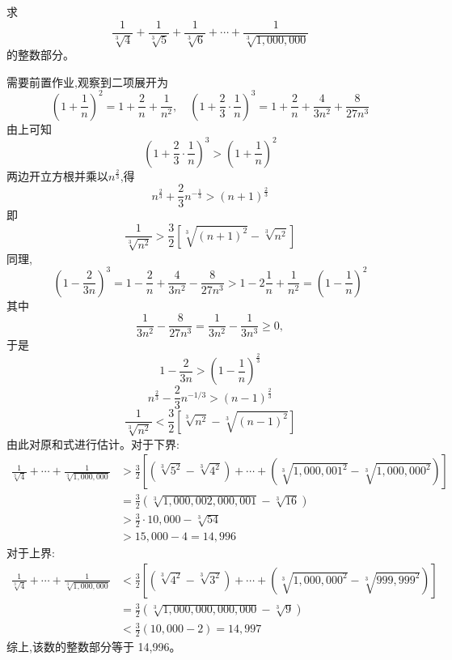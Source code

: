 \begin{questions}
    \question 求
    \[
    \frac{1}{\sqrt[3]{4}} + \frac{1}{\sqrt[3]{5}} + \frac{1}{\sqrt[3]{6}} + \cdots + \frac{1}{\sqrt[3]{1,000,000}}
    \]
    的整数部分。
    \begin{solution}
        需要前置作业,观察到二项展开为
        \[
        \left(1 + \frac{1}{n}\right)^2 = 1 + \frac{2}{n} + \frac{1}{n^2},\quad \left(1 + \frac{2}{3} \cdot \frac{1}{n}\right)^3 = 1 + \frac{2}{n} + \frac{4}{3n^2} + \frac{8}{27n^3}
        \]
        由上可知
        \[ 
        \left(1 + \frac{2}{3} \cdot \frac{1}{n}\right)^3 > \left(1 + \frac{1}{n}\right)^2 
        \]
        两边开立方根并乘以$n^{\frac{2}{3}}$,得
        \[
        n^{\frac{2}{3}} + \frac{2}{3} n^{-\frac{1}{3}} > (n+1)^{\frac{2}{3}}
        \]
        即
        \[ 
        \frac{1}{\sqrt[3]{n^2}} > \frac{3}{2} \left[ \sqrt[3]{(n+1)^2} - \sqrt[3]{n^2} \right] 
        \]
        同理,
        \[
        \left( 1 - \frac{2}{3n} \right)^3 
        = 1 - \frac{2}{n} + \frac{4}{3n^2} - \frac{8}{27n^3} > 1 - 2\frac{1}{n} + \frac{1}{n^2} 
        = \left( 1 - \frac{1}{n} \right)^2
        \]
        其中 
        \[
        \frac{1}{3n^2} - \frac{8}{27n^3} = \frac{1}{3n^2} - \frac{1}{3n^3} \ge 0,
        \]
        于是
        \[
        1 - \frac{2}{3n} > \left( 1 - \frac{1}{n} \right)^{\frac{2}{3}}
        \]
        \[
        n^{\frac{2}{3}} - \frac{2}{3}n^{-1/3} > (n - 1)^{\frac{2}{3}}
        \]
        \[ 
        \frac{1}{\sqrt[3]{n^2}} < \frac
        {3}{2} \left[ \sqrt[3]{n^2} - \sqrt[3]{(n-1)^2} \right] 
        \]
        由此对原和式进行估计。对于下界:
        \begin{align*}
        \frac{1}{\sqrt[3]{4}} + \cdots + \frac{1}{\sqrt[3]{1,000,000}} 
        &> \frac{3}{2} \left[(\sqrt[3]{5^2} - \sqrt[3]{4^2}) + \cdots + (\sqrt[3]{1,000,001^2} - \sqrt[3]{1,000,000^2})\right] \\
        &= \frac{3}{2} (\sqrt[3]{1,000,002,000,001} - \sqrt[3]{16}) \\
        &> \frac{3}{2} \cdot 10,000 - \sqrt[3]{54} \\
        &> 15,000 - 4 = 14,996
        \end{align*}   
        对于上界:
        \begin{align*}
        \frac{1}{\sqrt[3]{4}} + \cdots + \frac{1}{\sqrt[3]{1,000,000}} 
        &< \frac{3}{2} \left[(\sqrt[3]{4^2} - \sqrt[3]{3^2}) + \cdots + (\sqrt[3]{1,000,000^2} - \sqrt[3]{999,999^2})\right] \\
        &= \frac{3}{2} (\sqrt[3]{1,000,000,000,000} - \sqrt[3]{9}) \\
        &< \frac{3}{2} (10,000 - 2) = 14,997
        \end{align*}
        综上,该数的整数部分等于 14,996。
    \end{solution}


\end{questions}

